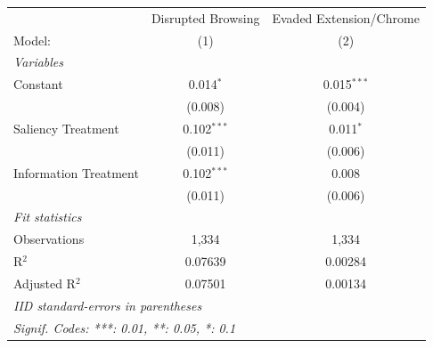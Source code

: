 
\begingroup
\centering
\begin{tabular}{lcc}
   \tabularnewline \midrule \midrule
                         & Disrupted Browsing & Evaded Extension/Chrome \\   
   Model:                & (1)                & (2)\\  
   \midrule
   \emph{Variables}\\
   Constant              & 0.014$^{*}$        & 0.015$^{***}$\\   
                         & (0.008)            & (0.004)\\   
   Saliency Treatment    & 0.102$^{***}$      & 0.011$^{*}$\\   
                         & (0.011)            & (0.006)\\   
   Information Treatment & 0.102$^{***}$      & 0.008\\   
                         & (0.011)            & (0.006)\\   
   \midrule
   \emph{Fit statistics}\\
   Observations          & 1,334              & 1,334\\  
   R$^2$                 & 0.07639            & 0.00284\\  
   Adjusted R$^2$        & 0.07501            & 0.00134\\  
   \midrule \midrule
   \multicolumn{3}{l}{\emph{IID standard-errors in parentheses}}\\
   \multicolumn{3}{l}{\emph{Signif. Codes: ***: 0.01, **: 0.05, *: 0.1}}\\
\end{tabular}
\par\endgroup


